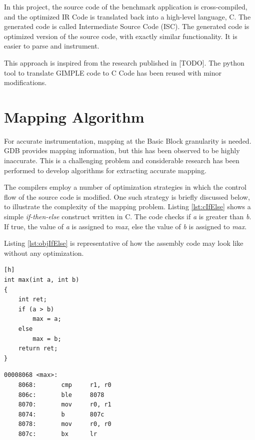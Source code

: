 In this project, the source code of the benchmark application is cross-compiled, and the optimized IR Code is translated back into a high-level language, C. The generated code is called Intermediate Source Code (ISC). The generated code is optimized version of the source code, with exactly similar functionality. It is easier to parse and instrument.

This approach is inspired from the research published in [TODO]. The python tool to translate GIMPLE code to C Code has been reused with minor modifications.

\section{Mapping Algorithm}
For accurate instrumentation, mapping at the Basic Block granularity is needed. GDB provides mapping information, but this has been observed to be highly inaccurate. This is a challenging problem and considerable research has been performed to develop algorithms for extracting accurate mapping.

The compilers employ a number of optimization strategies in which the control flow of the source code is modified. One such strategy is briefly discussed below, to illustrate the complexity of the mapping problem. Listing \ref{lst:cIfElse} shows a simple \emph{if-then-else} construct written in C. The code checks if \emph{a} is greater than \emph{b}. If true, the value of \emph{a} is assigned to \emph{max}, else the value of \emph{b} is assigned to \emph{max}.

Listing \ref{lst:objIfElse} is representative of how the assembly code may look like without any optimization.

\begin{center}
\begin{minipage}{0.7\textwidth}
\begin{lstlisting}[caption={Example C Code},label={lst:cIfElse}][h]
int max(int a, int b)
{
    int ret;
    if (a > b)
        max = a;
    else
        max = b;
    return ret;
}
\end{lstlisting}
\end{minipage}
\end{center}

\begin{center}
\begin{minipage}{0.7\textwidth}
\begin{lstlisting}[caption={Object Code},label={lst:objIfElse}]
00008068 <max>:
    8068:       cmp     r1, r0
    806c:       ble     8078   
    8070:       mov     r0, r1
    8074:       b       807c
    8078:       mov     r0, r0
    807c:       bx      lr
\end{lstlisting}
\end{minipage}
\end{center}

